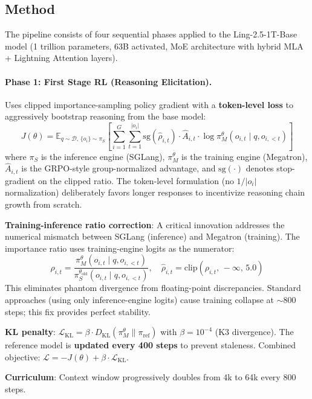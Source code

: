 \documentclass[11pt,a4paper]{article}
\begin{document}
\subsection{Method}

The pipeline consists of four sequential phases applied to the Ling-2.5-1T-Base model (1 trillion parameters, 63B activated, MoE architecture with hybrid MLA + Lightning Attention layers).

\paragraph{Phase 1: First Stage RL (Reasoning Elicitation).} Uses clipped importance-sampling policy gradient with a \textbf{token-level loss} to aggressively bootstrap reasoning from the base model:
\[
J(\theta) = \mathbb{E}_{q \sim \mathcal{D},\, \{o_i\} \sim \pi_S}\!\left[\sum_{i=1}^{G}\sum_{t=1}^{|o_i|} \mathrm{sg}(\hat{\rho}_{i,t}) \cdot \hat{A}_{i,t} \cdot \log \pi_M^\theta(o_{i,t} \mid q, o_{i,<t})\right]
\]
where $\pi_S$ is the inference engine (SGLang), $\pi_M^\theta$ is the training engine (Megatron), $\hat{A}_{i,t}$ is the GRPO-style group-normalized advantage, and $\mathrm{sg}(\cdot)$ denotes stop-gradient on the clipped ratio. The token-level formulation (no $1/|o_i|$ normalization) deliberately favors longer responses to incentivize reasoning chain growth from scratch.

\textbf{Training-inference ratio correction}: A critical innovation addresses the numerical mismatch between SGLang (inference) and Megatron (training). The importance ratio uses training-engine logits as the numerator:
\[
\rho_{i,t} = \frac{\pi_M^\theta(o_{i,t} \mid q, o_{i,<t})}{\pi_S^{\theta_{\mathrm{old}}}(o_{i,t} \mid q, o_{i,<t})}, \quad \hat{\rho}_{i,t} = \mathrm{clip}(\rho_{i,t},\, -\infty,\, 5.0)
\]
This eliminates phantom divergence from floating-point discrepancies. Standard approaches (using only inference-engine logits) cause training collapse at ${\sim}$800 steps; this fix provides perfect stability.

\textbf{KL penalty}: $\mathcal{L}_{\mathrm{KL}} = \beta \cdot D_{\mathrm{KL}}(\pi_M^\theta \| \pi_{\mathrm{ref}})$ with $\beta = 10^{-4}$ (K3 divergence). The reference model is \textbf{updated every 400 steps} to prevent staleness. Combined objective: $\mathcal{L} = -J(\theta) + \beta \cdot \mathcal{L}_{\mathrm{KL}}$.

\textbf{Curriculum}: Context window progressively doubles from 4k to 64k every 800 steps.
\end{document}
